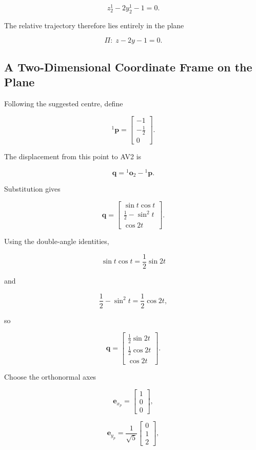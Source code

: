 \documentclass[11pt,a4paper]{article}
\begin{document}
\[
\boxed{
z_2^1 - 2y_2^1 - 1 = 0
}.
\]

The relative trajectory therefore lies entirely in the plane

\[
\boxed{
\Pi:\; z - 2y - 1 = 0
}.
\]

\subsection{A Two-Dimensional Coordinate Frame on the Plane}

Following the suggested centre, define

\[
{}^{1}\bm{p} =
\begin{bmatrix}
-1\\
-\frac{1}{2}\\
0
\end{bmatrix}.
\]

The displacement from this point to AV2 is

\[
\bm{q}
=
{}^{1}\bm{o}_2 -
{}^{1}\bm{p}.
\]

Substitution gives

\[
\bm{q}
=
\begin{bmatrix}
\sin t\cos t\\
\frac{1}{2}-\sin^2 t\\
\cos 2t
\end{bmatrix}.
\]

Using the double-angle identities,

\[
\sin t\cos t = \frac{1}{2}\sin 2t
\]

and

\[
\frac{1}{2}-\sin^2 t
=
\frac{1}{2}\cos 2t,
\]

so

\[
\bm{q}
=
\begin{bmatrix}
\frac{1}{2}\sin 2t\\
\frac{1}{2}\cos 2t\\
\cos 2t
\end{bmatrix}.
\]

Choose the orthonormal axes

\[
\bm{e}_{x_p}
=
\begin{bmatrix}
1\\0\\0
\end{bmatrix},
\]

\[
\bm{e}_{y_p}
=
\frac{1}{\sqrt{5}}
\begin{bmatrix}
0\\1\\2
\end{bmatrix},
\]
\end{document}
